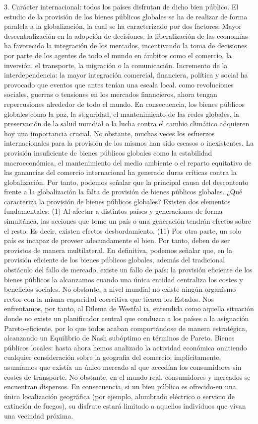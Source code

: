 \documentclass[10pt,a4paper]{article}
\begin{document}
3. Carácter internacional: todos los países disfrutan de dicho bien público. El estudio de la provisión de los bienes públicos globales se ha de realizar de forma paralela a la globalización, la cual se ha caracterizado por dos factores: Mayor descentralización en la adopción de decisiones: la liberalización de las economías ha favorecido la integración de los mercados, incentivando la toma de decisiones por parte de los agentes de todo el mundo en ámbitos como el comercio, la inversión, el transporte, la migración o la comunicación. Incremento de la interdependencia: la mayor integración comercial, financiera, política y social ha provocado que eventos que antes tenían una escala local. como revoluciones sociales, guerras o tensiones en los mercados financieros, ahora tengan repercusiones alrededor de todo el mundo. En consecuencia, los bienes públicos globales como la paz, la st:guridad, el mantenimiento de las redes globales, la preservación de la salud mundial o la lucha contra el cambio climático adquieren hoy una importancia crucial. No obstante, muchas veces los esfuerzos internacionales para la provisión de los mismos han sido escasos o inexistentes. La provisión insuficiente de bienes públicos globales como la estabilidad macroeconómica, el mantenimiento del medio ambiente o el reparto equitativo de las ganancias del comercio internacional ha generado duras críticas contra la globalización. Por tanto, podemos señalar que la principal causa del descontento frente a la globalización la falta de provisión de bienes públicos globales. ¿Qué caracteriza la provisión de bienes públicos globales? Existen dos elementos fundamentales: (1) Al afectar a distintos países y generaciones de forma simultánea, las acciones que tome un país o una generación tendrán efectos sobre el resto. Es decir, existen efectos desbordamiento. (11) Por otra parte, un solo país es incapaz de proveer adecuadamente el bien. Por tanto, deben de ser provistos de manera multilateral. En definitiva, podemos señalar que, en la provisión eficiente de los bienes públicos globales, además del tradicional obstáculo del fallo de mercado, existe un fallo de país: la provisión eficiente de los bienes públicos la alcanzamos cuando una única entidad centraliza los costes y beneficios sociales. No obstante, a nivel mundial no existe ningún organismo rector con la misma capacidad coercitiva que tienen los Estados. Nos enfrentamos, por tanto, al Dilema de Westfal ia, entendida como aquella situación donde no existe un planificador central que conduzca a los países a la asignación Pareto-eficiente, por lo que todos acaban comportándose de manera estratégica, alcanzando un Equilibrio de Nash subóptimo en términos de Pareto. Bienes públicos locales: hasta ahora hemos analizado la actividad económica omitiendo cualquier consideración sobre la geografia del comercio: implícitamente, asumíamos que existía un único mercado al que accedían los consumidores sin costes de transporte. No obstante, en el mundo real, consumidores y mercados se encuentran dispersos. En consecuencia, si un bien público es ofrecido-en una única localización geográfica (por ejemplo, alumbrado eléctrico o servicio de extinción de fuegos), su disfrute estará limitado a aquellos individuos que vivan una vecindad próxima. 
\end{document}
